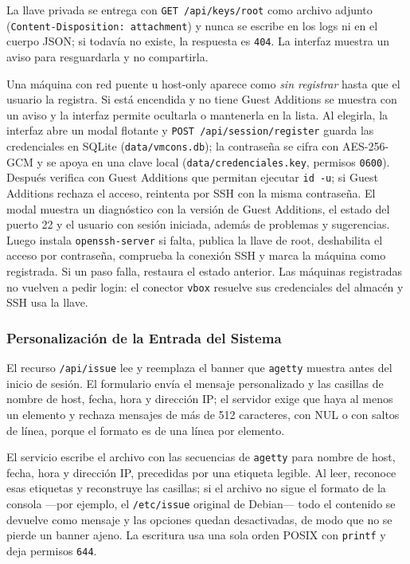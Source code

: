 La llave privada se entrega con \texttt{GET /api/keys/root} como archivo
adjunto (\texttt{Content-Disposition: attachment}) y nunca se escribe en
los logs ni en el cuerpo JSON; si todavía no existe, la respuesta es
\texttt{404}. La interfaz muestra un aviso para resguardarla y no
compartirla.

Una máquina con red puente u host-only aparece como \emph{sin registrar}
hasta que el usuario la registra. Si está encendida y no tiene Guest
Additions se muestra con un aviso y la interfaz permite ocultarla o
mantenerla en la lista. Al elegirla, la
interfaz abre un modal flotante y \texttt{POST /api/session/register}
guarda las credenciales en SQLite (\texttt{data/vmcons.db}); la
contraseña se cifra con AES-256-GCM y se apoya en una clave local
(\texttt{data/credenciales.key}, permisos \texttt{0600}). Después verifica
con Guest Additions que permitan ejecutar
\texttt{id -u}; si Guest Additions rechaza el acceso, reintenta por SSH
con la misma contraseña. El modal muestra un diagnóstico con la versión
de Guest Additions, el estado del puerto 22 y el usuario con sesión
iniciada, además de problemas y sugerencias. Luego instala
\texttt{openssh-server} si falta,
publica la llave de root, deshabilita el acceso por contraseña, comprueba
la conexión SSH y marca la máquina como registrada. Si un paso falla, restaura el estado
anterior. Las máquinas registradas no vuelven a pedir login: el conector
\texttt{vbox} resuelve sus credenciales del almacén y SSH usa la llave.

\subsubsection{Personalización de la Entrada del Sistema}
\label{sec:issue}

El recurso \texttt{/api/issue} lee y reemplaza el banner que
\texttt{agetty} muestra antes del inicio de sesión. El formulario envía
el mensaje personalizado y las casillas de nombre de host, fecha, hora y
dirección IP; el servidor exige que haya al menos un elemento y rechaza
mensajes de más de 512 caracteres, con NUL o con saltos de línea, porque
el formato es de una línea por elemento.

El servicio escribe el archivo con las secuencias de \texttt{agetty}
para nombre de host, fecha, hora y dirección IP, precedidas por una
etiqueta legible. Al leer, reconoce esas etiquetas y reconstruye las
casillas; si el archivo no sigue el formato de la consola ---por
ejemplo, el \texttt{/etc/issue} original de Debian--- todo el contenido
se devuelve como mensaje y las opciones quedan desactivadas, de modo que
no se pierde un banner ajeno. La escritura usa una sola orden POSIX con
\texttt{printf} y deja permisos \texttt{644}.

